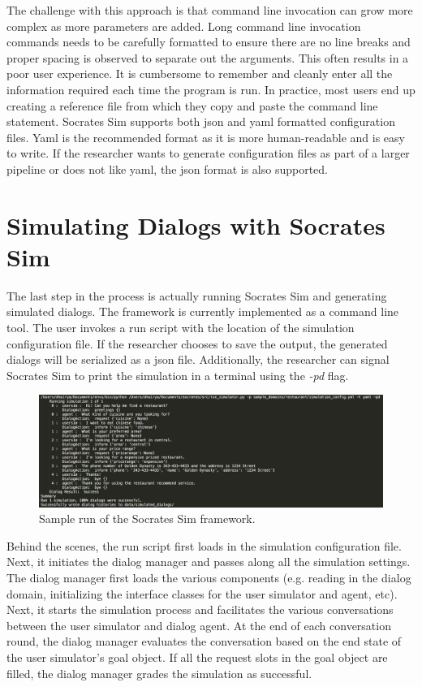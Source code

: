 The challenge with this approach is that command line invocation can grow more complex as more parameters are added. Long command line invocation commands needs to be carefully formatted to ensure there are no line breaks and proper spacing is observed to separate out the arguments. This often results in a poor user experience. It is cumbersome to remember and cleanly enter all the information required each time the program is run. In practice, most users end up creating a reference file from which they copy and paste the command line statement. Socrates Sim supports both json and yaml formatted configuration files. Yaml is the recommended format as it is more human-readable and is easy to write. If the researcher wants to generate configuration files as part of a larger pipeline or does not like yaml, the json format is also supported. 

\section{Simulating Dialogs with Socrates Sim}

The last step in the process is actually running Socrates Sim and generating simulated dialogs. The framework is currently implemented as a command line tool. The user invokes a run script with the location of the simulation configuration file. If the researcher chooses to save the output, the generated dialogs will be serialized as a json file. Additionally, the researcher can signal Socrates Sim to print the simulation in a terminal using the \textit{-pd} flag. 

\begin{figure}[h!]
	\centering
	\includegraphics[scale=.15]{diagrams/sample_run.jpeg}
	\caption{ Sample run of the Socrates Sim framework. }
	\label{fig:sample_run}
\end{figure}

Behind the scenes, the run script first loads in the simulation configuration file. Next, it initiates the dialog manager and passes along all the simulation settings. The dialog manager first loads the various components (e.g. reading in the dialog domain, initializing the interface classes for the user simulator and agent, etc). Next, it starts the simulation process and facilitates the various conversations between the user simulator and dialog agent. At the end of each conversation round, the dialog manager evaluates the conversation based on the end state of the user simulator's goal object. If all the request slots in the goal object are filled, the dialog manager grades the simulation as successful. 

